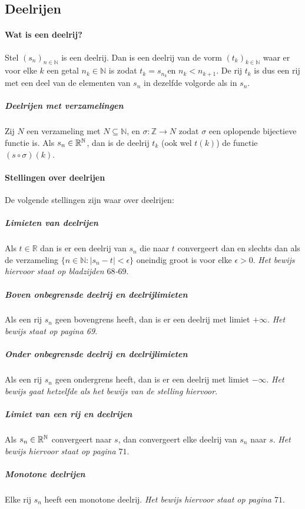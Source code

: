\subsection{Deelrijen}

\paragraph{Wat is een deelrij?} Stel $(s_{n})_{n\in\mathbb{N}}$ is een deelrij. Dan is een deelrij van de vorm $(t_{k})_{k\in\mathbb{N}}$ waar er voor elke $k$ een getal $n_{k}\in\mathbb{N}$ is zodat $t_{k}=s_{n_{k}}$en $n_{k}<n_{k+1}$. De rij $t_{k}$ is dus een rij met een deel van de elementen van $s_{n}$ in dezelfde volgorde als in $s_{n}$.

\subparagraph{Deelrijen met verzamelingen} Zij $N$ een verzameling met $N\subseteq\mathbb{N}$, en $\sigma:\mathbb{Z} \to N$ zodat $\sigma$ een oplopende bijectieve functie is. Als $s_{n}\in\mathbb{R}^{\mathbb{N}}$, dan is de deelrij $t_{k}$ (ook wel $t(k)$) de functie $(s\circ\sigma)(k)$.

\paragraph{Stellingen over deelrijen} De volgende stellingen zijn waar over deelrijen:

\subparagraph{Limieten van deelrijen} Als $t\in\mathbb{R}$ dan is er een deelrij van $s_{n}$ die naar $t$ convergeert dan en slechts dan als de verzameling $\{n\in\mathbb{N}:|s_{n}-t|<\epsilon\}$ oneindig groot is voor elke $\epsilon>0$. \textit{Het bewijs hiervoor staat op bladzijden $68$-$69$}.

\subparagraph{Boven onbegrensde deelrij en deelrijlimieten} Als een rij $s_{n}$ geen bovengrens heeft, dan is er een deelrij met limiet $+\infty$. \textit{Het bewijs staat op pagina 69}.

\subparagraph{Onder onbegrensde deelrij en deelrijlimieten} Als een rij $s_{n}$ geen ondergrens heeft, dan is er een deelrij met limiet $-\infty$. \textit{Het bewijs gaat hetzelfde als het bewijs van de stelling hiervoor}.

\subparagraph{Limiet van een rij en deelrijen} Als $s_{n}\in\mathbb{R}^{\mathbb{N}}$ convergeert naar $s$, dan convergeert elke deelrij van $s_{n}$ naar $s$. \textit{Het bewijs hiervoor staat op pagina $71$}.

\subparagraph{Monotone deelrijen} Elke rij $s_{n}$ heeft een monotone deelrij. \textit{Het bewijs hiervoor staat op pagina $71$}.

